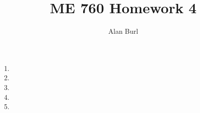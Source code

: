 \documentclass[12pt]{article}
\author{Alan Burl}
\title{ME 760 Homework 4}
\begin{document}
\maketitle
\clearpage
\begin{enumerate}
	\item \clearpage %
	\item \clearpage %
	\item \clearpage  
	\item \clearpage %
	\item \clearpage 


\end{enumerate}
\clearpage
\end{document}
